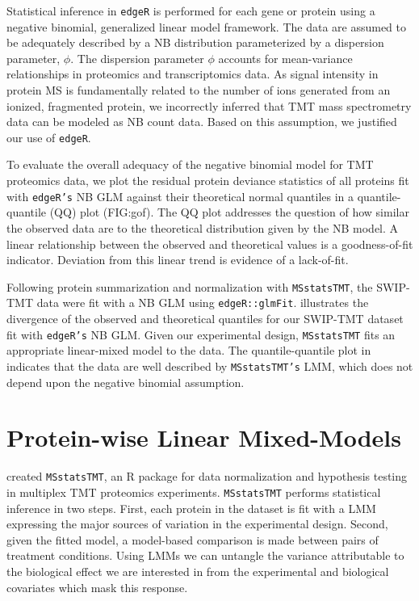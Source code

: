 \documentclass[11pt]{elife}\usepackage[]{graphicx}\usepackage[]{color}
\begin{document}
Statistical inference in \texttt{edgeR} is performed for each gene or protein
using a negative binomial, generalized linear model framework.  The data are
assumed to be adequately described by a NB distribution parameterized by a
dispersion parameter, $\phi$. The dispersion parameter $\phi$ accounts for
mean-variance relationships in proteomics and transcriptomics data.  As signal
intensity in protein MS is fundamentally related to the number of ions generated
from an ionized, fragmented protein, we incorrectly inferred that TMT mass
spectrometry data can be modeled as NB count data. Based on this assumption, we
justified our use of \texttt{edgeR}.  

To evaluate the overall adequacy of the negative binomial model for TMT
proteomics data, we plot the residual protein deviance statistics of all
proteins fit with \texttt{edgeR's} NB GLM against their theoretical normal
quantiles in a quantile-quantile (QQ) plot (FIG:gof).  The QQ plot addresses the
question of how similar the observed data are to the theoretical distribution
given by the NB model.  A linear relationship between the observed and
theoretical values is a goodness-of-fit indicator.  Deviation from this linear
trend is evidence of a lack-of-fit.

Following protein summarization and normalization with \texttt{MSstatsTMT}, the
SWIP-TMT data were fit with a NB GLM using \texttt{edgeR::glmFit}. 
illustrates the divergence of the observed and theoretical quantiles for our
SWIP-TMT dataset fit with \texttt{edgeR's} NB GLM. Given our experimental
design, \texttt{MSstatsTMT} fits an appropriate linear-mixed model to the data.
The quantile-quantile plot in  indicates that the data are well
described by \texttt{MSstatsTMT's} LMM, which does not depend upon the negative
binomial assumption.


\section{Protein-wise Linear Mixed-Models}

\cite{Huang2020} created \texttt{MSstatsTMT}, an R package for data
normalization and hypothesis testing in multiplex TMT proteomics experiments.
\texttt{MSstatsTMT} performs statistical inference in two steps.
First, each protein in the dataset is fit with a LMM
expressing the major sources of variation in the experimental design.
Second, given the fitted model, a model-based comparison is made between pairs
of treatment conditions. Using LMMs we can untangle the variance
attributable to the biological effect we are interested in from the experimental
and biological covariates which mask this response.
\end{document}
